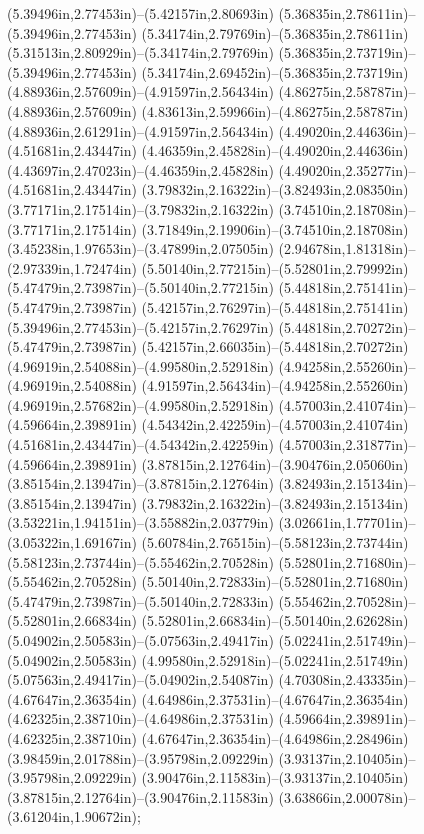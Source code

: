 (5.39496in,2.77453in)--(5.42157in,2.80693in) (5.36835in,2.78611in)--(5.39496in,2.77453in) (5.34174in,2.79769in)--(5.36835in,2.78611in) (5.31513in,2.80929in)--(5.34174in,2.79769in) (5.36835in,2.73719in)--(5.39496in,2.77453in) (5.34174in,2.69452in)--(5.36835in,2.73719in) (4.88936in,2.57609in)--(4.91597in,2.56434in) (4.86275in,2.58787in)--(4.88936in,2.57609in) (4.83613in,2.59966in)--(4.86275in,2.58787in) (4.88936in,2.61291in)--(4.91597in,2.56434in) (4.49020in,2.44636in)--(4.51681in,2.43447in) (4.46359in,2.45828in)--(4.49020in,2.44636in) (4.43697in,2.47023in)--(4.46359in,2.45828in) (4.49020in,2.35277in)--(4.51681in,2.43447in) (3.79832in,2.16322in)--(3.82493in,2.08350in) (3.77171in,2.17514in)--(3.79832in,2.16322in) (3.74510in,2.18708in)--(3.77171in,2.17514in) (3.71849in,2.19906in)--(3.74510in,2.18708in) (3.45238in,1.97653in)--(3.47899in,2.07505in) (2.94678in,1.81318in)--(2.97339in,1.72474in) (5.50140in,2.77215in)--(5.52801in,2.79992in) (5.47479in,2.73987in)--(5.50140in,2.77215in) (5.44818in,2.75141in)--(5.47479in,2.73987in) (5.42157in,2.76297in)--(5.44818in,2.75141in) (5.39496in,2.77453in)--(5.42157in,2.76297in) (5.44818in,2.70272in)--(5.47479in,2.73987in) (5.42157in,2.66035in)--(5.44818in,2.70272in) (4.96919in,2.54088in)--(4.99580in,2.52918in) (4.94258in,2.55260in)--(4.96919in,2.54088in) (4.91597in,2.56434in)--(4.94258in,2.55260in) (4.96919in,2.57682in)--(4.99580in,2.52918in) (4.57003in,2.41074in)--(4.59664in,2.39891in) (4.54342in,2.42259in)--(4.57003in,2.41074in) (4.51681in,2.43447in)--(4.54342in,2.42259in) (4.57003in,2.31877in)--(4.59664in,2.39891in) (3.87815in,2.12764in)--(3.90476in,2.05060in) (3.85154in,2.13947in)--(3.87815in,2.12764in) (3.82493in,2.15134in)--(3.85154in,2.13947in) (3.79832in,2.16322in)--(3.82493in,2.15134in) (3.53221in,1.94151in)--(3.55882in,2.03779in) (3.02661in,1.77701in)--(3.05322in,1.69167in) (5.60784in,2.76515in)--(5.58123in,2.73744in) (5.58123in,2.73744in)--(5.55462in,2.70528in) (5.52801in,2.71680in)--(5.55462in,2.70528in) (5.50140in,2.72833in)--(5.52801in,2.71680in) (5.47479in,2.73987in)--(5.50140in,2.72833in) (5.55462in,2.70528in)--(5.52801in,2.66834in) (5.52801in,2.66834in)--(5.50140in,2.62628in) (5.04902in,2.50583in)--(5.07563in,2.49417in) (5.02241in,2.51749in)--(5.04902in,2.50583in) (4.99580in,2.52918in)--(5.02241in,2.51749in) (5.07563in,2.49417in)--(5.04902in,2.54087in) (4.70308in,2.43335in)--(4.67647in,2.36354in) (4.64986in,2.37531in)--(4.67647in,2.36354in) (4.62325in,2.38710in)--(4.64986in,2.37531in) (4.59664in,2.39891in)--(4.62325in,2.38710in) (4.67647in,2.36354in)--(4.64986in,2.28496in) (3.98459in,2.01788in)--(3.95798in,2.09229in) (3.93137in,2.10405in)--(3.95798in,2.09229in) (3.90476in,2.11583in)--(3.93137in,2.10405in) (3.87815in,2.12764in)--(3.90476in,2.11583in) (3.63866in,2.00078in)--(3.61204in,1.90672in);
